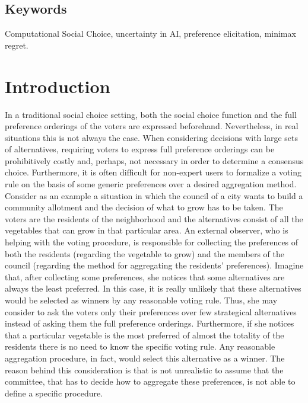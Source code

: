 \documentclass[a4paper,twoside]{article}
\begin{document}
\subsection*{Keywords}
Computational Social Choice, uncertainty in AI, preference elicitation, minimax regret.

\section{Introduction}
In a traditional social choice setting, both the social choice function and the full preference orderings of the voters are expressed beforehand. Nevertheless, in real situations this is not always the case. When considering decisions with large sets of alternatives, requiring voters to express full preference orderings can be prohibitively costly and, perhaps, not necessary in order to determine a consensus choice. Furthermore, it is often difficult for non-expert users to formalize a voting rule on the basis of some generic preferences over a desired aggregation method. Consider as an example a situation in which the council of a city wants to build a community allotment and the decision of what to grow has to be taken. The voters are the residents of the neighborhood and the alternatives consist of all the vegetables that can grow in that particular area. An external observer, who is helping with the voting procedure, is responsible for collecting the preferences of both the residents (regarding the vegetable to grow) and the members of the council (regarding the method for aggregating the residents' preferences). Imagine that, after collecting some preferences, she notices that some alternatives are always the least preferred. In this case, it is really unlikely that these alternatives would be selected as winners by any reasonable voting rule. Thus, she may consider to ask the voters only their preferences over few strategical alternatives instead of asking them the full preference orderings. Furthermore, if she notices that a particular vegetable is the most preferred of almost the totality of the residents there is no need to know the specific voting rule. Any reasonable aggregation procedure, in fact, would select this alternative as a winner. The reason behind this consideration is that is not unrealistic to assume that the committee, that has to decide how to aggregate these preferences, is not able to define a specific procedure. \\
\end{document}
